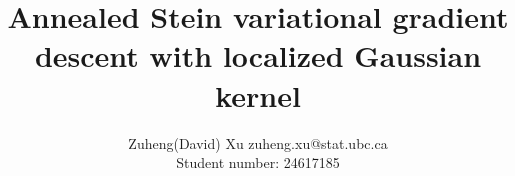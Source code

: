 \documentclass[11pt]{article}
\begin{document}
\title{Annealed Stein variational gradient descent with localized Gaussian kernel}

\author{\name Zuheng(David) Xu \email zuheng.xu@stat.ubc.ca \\
       \addr Student number: 24617185\\}      


\maketitle










\newpage




\newpage
\appendix

\end{document}
